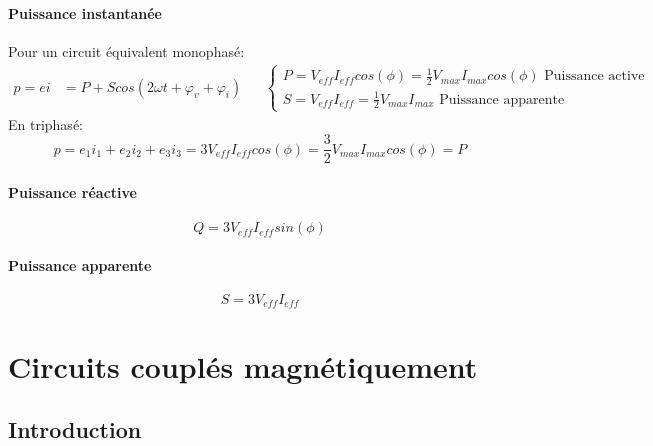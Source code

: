 \documentclass{report}
\begin{document}
\subsubsection{Puissance instantanée}
Pour un circuit équivalent monophasé:
\begin{align*}
p = ei &= P + S cos(2 \omega t + \varphi_v + \varphi_i) & &\begin{cases}
P = V_{eff}I_{eff} cos(\phi) = \frac{1}{2} V_{max} I_{max} cos(\phi) \text{     Puissance active}\\
S = V_{eff}I_{eff} = \frac{1}{2} V_{max} I_{max} \text{      Puissance apparente}
\end{cases}
\end{align*}
En triphasé:
\begin{equation}
p = e_1 i_1 + e_2 i_2 + e_3 i_3 = 3 V_{eff} I_{eff} cos(\phi) = \frac{3}{2} V_{max} I_{max} cos(\phi) = P
\end{equation}

\subsubsection{Puissance réactive}
\begin{equation}
Q = 3 V_{eff} I_{eff} sin(\phi)
\end{equation}

\subsubsection{Puissance apparente}
\begin{equation}
S = 3 V_{eff} I_{eff}
\end{equation}

\chapter{Circuits couplés magnétiquement}
\section{Introduction}
\end{document}
